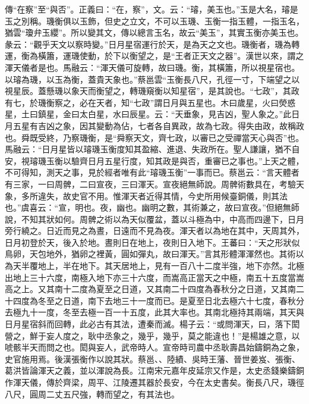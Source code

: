{\noindent\zhuan{}\fzbyks 傳“在察”至“與否”。正義曰：“在，察”，文。云：“璿，美玉也。”玉是大名，璿是玉之別稱。璣衡俱以玉飾，但史之立文，不可以玉璣、玉衡一指玉體，一指玉名，猶雲“瓊弁玉纓”。所以變其文，傳以總言玉名，故云“美玉”，其實玉衡亦美玉也。彖云：“觀乎天文以察時變。”日月星宿運行於天，是為天之文也。璣衡者，璣為轉運，衡為橫簫，運璣使動，於下以衡望之，是“王者正天文之器”。漢世以來，謂之渾天儀者是也。馬融云：“渾天儀可旋轉，故曰璣。衡，其橫簫，所以視星宿也。以璿為璣，以玉為衡，蓋貴天象也。”蔡邕雲“玉衡長八尺，孔徑一寸，下端望之以視星辰。蓋懸璣以象天而衡望之，轉璣窺衡以知星宿”，是其說也。“七政”，其政有七，於璣衡察之，必在天者，知“七政”謂日月與五星也。木曰歲星，火曰熒惑星，土曰鎮星，金曰太白星，水曰辰星。云：“天垂象，見吉凶，聖人象之。”此日月五星有吉凶之象，因其變動為佔，七者各自異政，故為七政。得失由政，故稱政也。舜既受終，乃察璣衡，是“舜察天文，齊七政，以審已之受禪當天心與否”也。馬融云：“日月星皆以璿璣玉衡度知其盈縮、進退、失政所在。聖人謙讓，猶不自安，視璿璣玉衡以驗齊日月五星行度，知其政是與否，重審已之事也。”上天之體，不可得知，測天之事，見於經者唯有此“璿璣玉衡”一事而已。蔡邕云：“言天體者有三家，一曰周髀，二曰宣夜，三曰渾天。宣夜絕無師說。周髀術數具在，考驗天象，多所違失，故史官不用。惟渾天者近得其情，今史所用候臺銅儀，則其法也。”虞喜云：“宣，明也。夜，幽也。幽明之數，其術兼之，故曰宣夜。”但絕無師說，不知其狀如何。周髀之術以為天似覆盆，蓋以斗極為中，中高而四邊下，日月旁行繞之。日近而見之為晝，日遠而不見為夜。渾天者以為地在其中，天周其外，日月初登於天，後入於地。晝則日在地上，夜則日入地下。王蕃曰：“天之形狀似鳥卵，天包地外，猶卵之裡黃，圓如彈丸，故曰渾天。”言其形體渾渾然也。其術以為天半覆地上，半在地下。其天居地上，見有一百八十二度半強，地下亦然。北極出地上三十六度，南極入地下亦三十六度，而嵩高正當天之中極，南五十五度當嵩高之上。又其南十二度為夏至之日道，又其南二十四度為春秋分之日道，又其南二十四度為冬至之日道，南下去地三十一度而已。是夏至日北去極六十七度，春秋分去極九十一度，冬至去極一百一十五度，此其大率也。其南北極持其兩端，其天與日月星宿斜而回轉，此必古有其法，遭秦而滅。楊子云：“或問渾天，曰，落下閎營之，鮮于妄人度之，耿中丞象之，幾乎，幾乎，莫之能違也！”是楊雄之意，以唬骸半天而問之也。閎與妄人，武帝時人。宣帝時司農中丞耿壽昌始鑄銅為之象，史官施用焉。後漢張衡作以說其狀。蔡邕、、陸績、吳時王藩、晉世姜岌、張衡、葛洪皆論渾天之義，並以渾說為長。江南宋元嘉年皮延宗又作是，太史丞錢樂鑄銅作渾天儀，傳於齊梁，周平、江陵遷其器於長安，今在太史書矣。衡長八尺，璣徑八尺，圓周二丈五尺強，轉而望之，有其法也。 \par}

